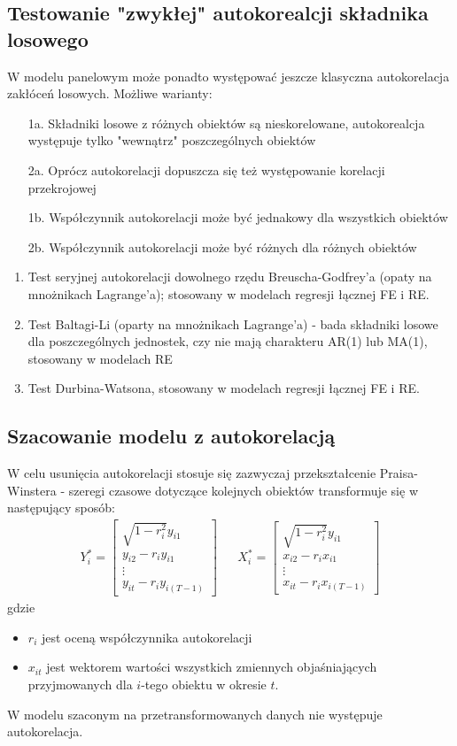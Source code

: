 \subsection{Testowanie "zwykłej" autokorealcji składnika losowego}
W modelu panelowym może ponadto występować jeszcze klasyczna autokorelacja zakłóceń losowych. Możliwe warianty:
\begin{itemize}
\item[1a.] Składniki losowe z różnych obiektów są nieskorelowane, autokorealcja występuje tylko "wewnątrz" poszczególnych obiektów
\item[2a.] Oprócz autokorelacji dopuszcza się też występowanie korelacji przekrojowej
\item[1b.] Współczynnik autokorelacji może być jednakowy dla wszystkich obiektów
\item[2b.] Współczynnik autokorelacji może być różnych dla różnych obiektów
\end{itemize}
\begin{enumerate}
\item Test seryjnej autokorelacji dowolnego rzędu Breuscha-Godfrey'a (opaty na mnożnikach Lagrange'a); stosowany w modelach regresji łącznej FE i RE.
\item Test Baltagi-Li (oparty na mnożnikach Lagrange'a) - bada składniki losowe dla poszczególnych jednostek, czy nie mają charakteru AR(1) lub MA(1), stosowany w modelach RE
\item Test Durbina-Watsona, stosowany w modelach regresji łącznej FE i RE.
\end{enumerate}
\subsection{Szacowanie modelu z autokorelacją}
W celu usunięcia autokorelacji stosuje się zazwyczaj przekształcenie Praisa-Winstera - szeregi czasowe dotyczące kolejnych obiektów transformuje się w następujący sposób:
\begin{align*}
Y_i^*=
\begin{bmatrix}
\sqrt{1-r_i^2}y_{i1}\\
y_{i2}-r_iy_{i1}\\
\vdots \\
y_{it}-r_iy_{i(T-1)}
\end{bmatrix}
&&
X_i^*=
\begin{bmatrix}
\sqrt{1-r_i^2}y_{i1}\\
x_{i2}-r_ix_{i1}\\
\vdots \\
x_{it}-r_ix_{i(T-1)}
\end{bmatrix}
\end{align*}
gdzie
\begin{itemize}
\item $ r_i $ jest oceną współczynnika autokorelacji
\item $ x_{it} $ jest wektorem wartości wszystkich zmiennych objaśniających przyjmowanych dla $ i $-tego obiektu w okresie $ t $.
\end{itemize}
W modelu szaconym na przetransformowanych danych nie występuje autokorelacja.
